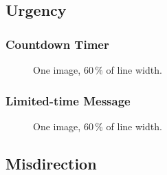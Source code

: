     \subsection*{Urgency}
    \blind[1]
        \subsubsection*{Countdown Timer}
        \blind[1]
        \begin{figure}
            \centering
            \caption{One image, $60\,\%$ of line width.  
              }
            \label{fig:TODO}
        \end{figure}
        \subsubsection*{Limited-time Message}
        \blind[1]
        \begin{figure}
            \centering
            \caption{One image, $60\,\%$ of line width.  
              }
            \label{fig:TODO}
        \end{figure}
    \subsection*{Misdirection}
    \blind[1]
